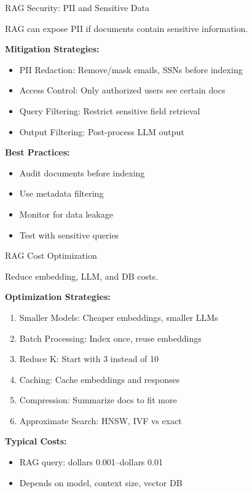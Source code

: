 \documentclass[aspectratio=169,11pt]{beamer}
\begin{document}
\begin{frame}{RAG Security: PII and Sensitive Data}
  \begin{warningbox}[Risk]
    RAG can expose PII if documents contain sensitive information.
  \end{warningbox}

  \textbf{Mitigation Strategies:}
  \begin{itemize}
    \setlength{\itemsep}{1pt}
    \item PII Redaction: Remove/mask emails, SSNs before indexing
    \item Access Control: Only authorized users see certain docs
    \item Query Filtering: Restrict sensitive field retrieval
    \item Output Filtering: Post-process LLM output
  \end{itemize}

  \textbf{Best Practices:}
  \begin{itemize}
    \setlength{\itemsep}{1pt}
    \item Audit documents before indexing
    \item Use metadata filtering
    \item Monitor for data leakage
    \item Test with sensitive queries
  \end{itemize}
\end{frame}

\begin{frame}{RAG Cost Optimization}
  \begin{tipbox}
    Reduce embedding, LLM, and DB costs.
  \end{tipbox}

  \textbf{Optimization Strategies:}
  \begin{enumerate}
    \setlength{\itemsep}{0pt}
    \item Smaller Models: Cheaper embeddings, smaller LLMs
    \item Batch Processing: Index once, reuse embeddings
    \item Reduce K: Start with 3 instead of 10
    \item Caching: Cache embeddings and responses
    \item Compression: Summarize docs to fit more
    \item Approximate Search: HNSW, IVF vs exact
  \end{enumerate}

  \textbf{Typical Costs:}
  \begin{itemize}
    \setlength{\itemsep}{1pt}
    \item RAG query: dollars 0.001--dollars 0.01
    \item Depends on model, context size, vector DB
  \end{itemize}
\end{frame}
\end{document}
